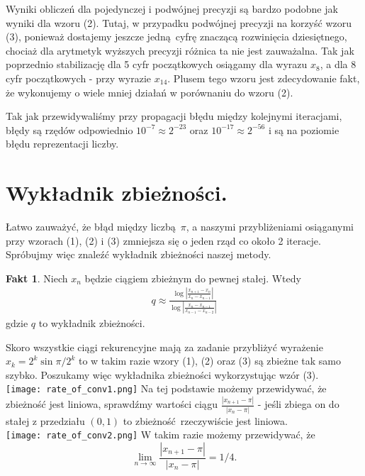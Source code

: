 \documentclass[10pt,wide]{mwart}
\theoremstyle{definition}
\newtheorem{fc}{Fakt}
\begin{document}
Wyniki obliczeń dla pojedynczej i podwójnej precyzji są bardzo podobne jak wyniki dla wzoru (2).
Tutaj, w przypadku podwójnej precyzji na korzyść wzoru (3), ponieważ dostajemy jeszcze jedną cyfrę znaczącą rozwinięcia dziesiętnego, chociaż dla arytmetyk wyższych precyzji różnica ta nie jest zauważalna.
Tak jak poprzednio stabilizację dla 5 cyfr początkowych osiągamy dla wyrazu \(x_{8}\), a dla 8 cyfr początkowych - przy wyrazie \(x_{14}\).
Plusem tego wzoru jest zdecydowanie fakt, że wykonujemy o wiele mniej działań w porównaniu do wzoru (2).
\par Tak jak przewidywaliśmy przy propagacji błędu między kolejnymi iteracjami,
błędy są rzędów odpowiednio \(10^{-7} \approx 2^{-23}\) oraz \(10^{-17} \approx 2^{-56}\) i są na poziomie błędu reprezentacji liczby.
\section{Wykładnik zbieżności.}
Łatwo zauważyć, że błąd między liczbą \(\pi\), a naszymi przybliżeniami osiąganymi przy wzorach (1), (2) i (3) zmniejsza się o jeden rząd co około 2 iteracje.  Spróbujmy więc znaleźć wykładnik zbieżności naszej metody.
\begin{fc}
  Niech \(x_n\) będzie ciągiem zbieżnym do pewnej stałej. Wtedy
  \begin{equation*}
    \begin{split}
      q \approx \frac{\log{|\frac{x_{n+1} - x_n}{x_n - x_{n-1}}|}}{\log{|\frac{x_n - x_{n-1}}{x_{n-1} - x_{n-2}}|}}
    \end{split}
  \end{equation*}
  gdzie \(q\) to wykładnik zbieżności.
\end{fc}
Skoro wszystkie ciągi rekurencyjne mają za zadanie przybliżyć wyrażenie \(x_k = 2^{k}\sin{\pi/2^k}\) to w takim razie wzory (1), (2) oraz (3) są zbieżne tak samo szybko.
Poszukamy więc wykładnika zbieżności wykorzystując wzór (3).
\\
\texttt{[image: rate\_of\_conv1.png]}
Na tej podstawie możemy przewidywać, że zbieżność jest liniowa, sprawdźmy wartości ciągu \(\frac{|x_{n+1} - \pi|}{|x_n - \pi|}\) - jeśli zbiega on do stałej z przedziału \((0,1)\) to zbieżność rzeczywiście jest liniowa.
\\
\texttt{[image: rate\_of\_conv2.png]}
W takim razie możemy przewidywać, że \begin{equation*}\lim_{n\to\infty} \frac{|x_{n+1} - \pi|}{|x_n - \pi|} = 1/4.\end{equation*} \\
\end{document}
